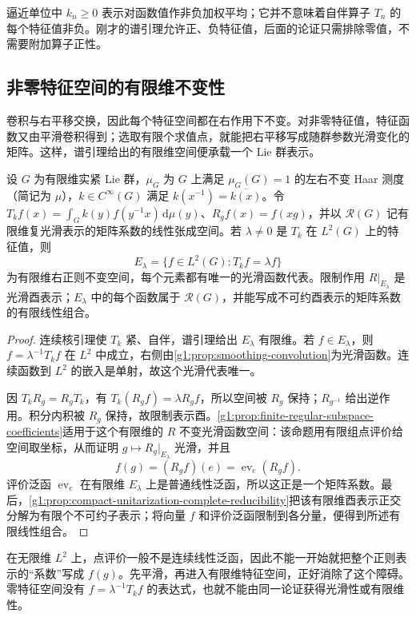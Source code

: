 逼近单位中 \(k_n\ge0\) 表示对函数值作非负加权平均；它并不意味着自伴算子 \(T_n\) 的每个特征值非负。刚才的谱引理允许正、负特征值，后面的论证只需排除零值，不需要附加算子正性。

\subsection{非零特征空间的有限维不变性}
\label{g1:subsec:2002:04}
卷积与右平移交换，因此每个特征空间都在右作用下不变。对非零特征值，特征函数又由平滑卷积得到；选取有限个求值点，就能把右平移写成随群参数光滑变化的矩阵。这样，谱引理给出的有限维空间便承载一个 Lie 群表示。

\begin{proposition}\label{g1:prop:convolution-eigenspace-representation}
	设 \(G\) 为有限维实紧 Lie 群，\(\mu_G\) 为 \(G\) 上满足 \(\mu_G(G)=1\) 的左右不变 Haar 测度（简记为 \(\mu\)），\(k\in C^\infty(G)\) 满足 \(k(x^{-1})=\overline{k(x)}\)。令 \(T_kf(x)=\int_G k(y)f(y^{-1}x)\,\mathrm{d}\mu(y)\)、\(R_gf(x)=f(xg)\)，并以 \(\mathcal R(G)\) 记有限维复光滑表示的矩阵系数的线性张成空间。若 \(\lambda\ne0\) 是 \(T_k\) 在 \(L^2(G)\) 上的特征值，则
	\[
		E_\lambda=\{f\in L^2(G):T_kf=\lambda f\}
	\]
	为有限维右正则不变空间，每个元素都有唯一的光滑函数代表。限制作用 \(R|_{E_\lambda}\) 是光滑酉表示；\(E_\lambda\) 中的每个函数属于 \(\mathcal R(G)\)，并能写成不可约酉表示的矩阵系数的有限线性组合。
\end{proposition}
\begin{proof}
	连续核引理使 \(T_k\) 紧、自伴，谱引理给出 \(E_\lambda\) 有限维。若 \(f\in E_\lambda\)，则 \(f=\lambda^{-1}T_kf\) 在 \(L^2\) 中成立，右侧由\cref{g1:prop:smoothing-convolution}为光滑函数。连续函数到 \(L^2\) 的嵌入是单射，故这个光滑代表唯一。

	因 \(T_kR_g=R_gT_k\)，有 \(T_k(R_gf)=\lambda R_gf\)，所以空间被 \(R_g\) 保持；\(R_{g^{-1}}\) 给出逆作用。积分内积被 \(R_g\) 保持，故限制表示酉。\cref{g1:prop:finite-regular-subspace-coefficients}适用于这个有限维的 \(R\) 不变光滑函数空间：该命题用有限组点评价给空间取坐标，从而证明 \(g\mapsto R_g|_{E_\lambda}\) 光滑，并且
	\[
		f(g)=(R_gf)(e)=\operatorname{ev}_e(R_gf).
	\]
	评价泛函 \(\operatorname{ev}_e\) 在有限维 \(E_\lambda\) 上是普通线性泛函，所以这正是一个矩阵系数。最后，\cref{g1:prop:compact-unitarization-complete-reducibility}把该有限维酉表示正交分解为有限个不可约子表示；将向量 \(f\) 和评价泛函限制到各分量，便得到所述有限线性组合。
\end{proof}

在无限维 \(L^2\) 上，点评价一般不是连续线性泛函，因此不能一开始就把整个正则表示的“系数”写成 \(f(g)\)。先平滑，再进入有限维特征空间，正好消除了这个障碍。零特征空间没有 \(f=\lambda^{-1}T_kf\) 的表达式，也就不能由同一论证获得光滑性或有限维性。

